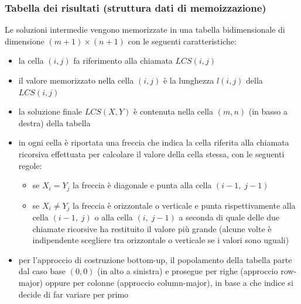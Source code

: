 \subsubsection*{Tabella dei risultati (struttura dati di memoizzazione)}
Le soluzioni intermedie vengono memorizzate in una tabella bidimensionale di dimensione \((m+1) \times (n+1)\) con le
seguenti caratteristiche:
\begin{itemize}
	\item la cella \((i,j)\) fa riferimento alla chiamata \(LCS(i, j)\)
	\item il valore memorizzato nella cella \((i,j)\) è la lunghezza \(l(i,j)\) della \(LCS(i, j)\)
	\item la soluzione finale \(LCS(X, Y)\) è contenuta nella cella \((m,n)\) (in basso a destra) della tabella
	\item in ogni cella è riportata una freccia che indica la cella riferita alla chiamata ricorsiva effettuata per
	calcolare il valore della cella stessa, con le seguenti regole:
	\begin{itemize}[topsep=-2pt]
		\item se \(X_i = Y_j\) la freccia è diagonale e punta alla cella \((i\!-\!1, \; j\!-\!1)\)
		\item se \(X_i \neq Y_j\) la freccia è orizzontale o verticale e punta rispettivamente alla cella \((i\!-\!1, \; j)\)
		o alla cella \((i, \; j\!-\!1)\) a seconda di quale delle due chiamate ricorsive ha restituito il valore più grande
		(alcune volte è indipendente scegliere tra orizzontale o verticale se i valori sono uguali)
	\end{itemize}
	\item per l'approccio di costruzione bottom-up, il popolamento della tabella parte dal caso base \((0,0)\) (in alto
	a sinistra) e prosegue per righe (approccio row-major) oppure per colonne (approccio column-major), in base a che
	indice si decide di far variare per primo
\end{itemize}

